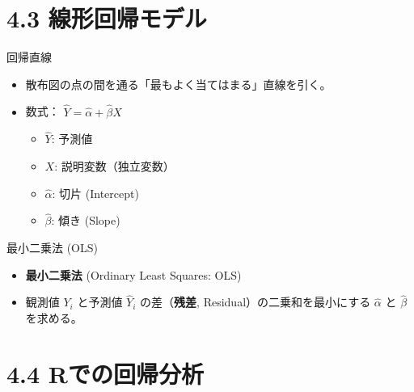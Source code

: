 \documentclass[
  ignorenonframetext,
]{beamer}
\providecommand{\tightlist}{%
  \setlength{\itemsep}{0pt}\setlength{\parskip}{0pt}}
\begin{document}
\hypertarget{ux7ddaux5f62ux56deux5e30ux30e2ux30c7ux30eb}{%
\section{4.3
線形回帰モデル}\label{ux7ddaux5f62ux56deux5e30ux30e2ux30c7ux30eb}}

\begin{frame}{回帰直線}
\protect\hypertarget{ux56deux5e30ux76f4ux7dda}{}
\begin{itemize}
\tightlist
\item
  散布図の点の間を通る「最もよく当てはまる」直線を引く。
\item
  数式： \(\hat{Y} = \hat{\alpha} + \hat{\beta} X\)

  \begin{itemize}
  \tightlist
  \item
    \(\hat{Y}\): 予測値
  \item
    \(X\): 説明変数（独立変数）
  \item
    \(\hat{\alpha}\): 切片 (Intercept)
  \item
    \(\hat{\beta}\): 傾き (Slope)
  \end{itemize}
\end{itemize}
\end{frame}

\begin{frame}{最小二乗法 (OLS)}
\protect\hypertarget{ux6700ux5c0fux4e8cux4e57ux6cd5-ols}{}
\begin{itemize}
\tightlist
\item
  \textbf{最小二乗法} (Ordinary Least Squares: OLS)
\item
  観測値 \(Y_i\) と予測値 \(\hat{Y}_i\) の差（\textbf{残差},
  Residual）の二乗和を最小にする \(\hat{\alpha}\) と \(\hat{\beta}\)
  を求める。
\end{itemize}
\end{frame}

\hypertarget{rux3067ux306eux56deux5e30ux5206ux6790}{%
\section{4.4
Rでの回帰分析}\label{rux3067ux306eux56deux5e30ux5206ux6790}}
\end{document}
